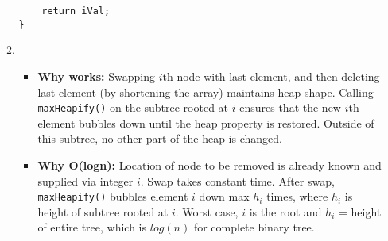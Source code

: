 \documentclass{article}
\begin{document}
\begin{enumerate}
\begin{enumerate}
\begin{lstlisting}
	return iVal;
}
		\end{lstlisting}
		
		\item 
		\begin{itemize}
			\item \textbf{Why works:} Swapping $i$th node with last element, and then deleting last element (by shortening the array) maintains heap shape. Calling \texttt{maxHeapify()} on the subtree rooted at $i$ ensures that the new $i$th element bubbles down until the heap property is restored. Outside of this subtree, no other part of the heap is changed.
			\item \textbf {Why O(logn):} Location of node to be removed is already known and supplied via integer $i$. Swap takes constant time. After swap, \texttt{maxHeapify()} bubbles element $i$ down max $h_i$ times, where $h_i$ is height of subtree rooted at $i$. Worst case, $i$ is the root and $h_i$ = height of entire tree, which is $log(n)$ for complete binary tree.
		\end{itemize}
		
	\end{enumerate}
		
\end{enumerate}
\end{document}
